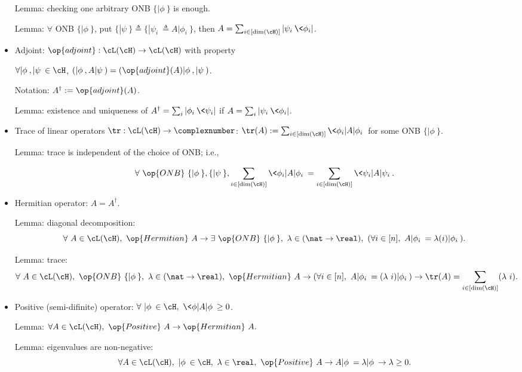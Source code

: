 \begin{itemize}
    Lemma: checking one arbitrary ONB $\{|\phi\>\}$ is enough.
    
    Lemma: $\forall$ ONB $\{|\phi\>\}$, put $\{|\psi\>\}\triangleq\{|\psi_i\> \triangleq A|\phi_i\>\}$, then $A = \sum_{i\in[\dim(\cH)]}|\psi_i\>\<\phi_i|$.
    
    \item Adjoint: $\op{adjoint} : \cL(\cH)\rightarrow\cL(\cH)$ with property
    
    $\forall |\phi\>,|\psi\>\in\cH$, $(|\phi\>,A|\psi\>) = (\op{adjoint}(A)|\phi\>,|\psi\>)$.
    
    Notation: $A^\dag := \op{adjoint}(A)$.
    
    Lemma: existence and uniqueness of $A^\dag = \sum_i|\phi_i\>\<\psi_i|$ if $A = \sum_i|\psi_i\>\<\phi_i|$.
    
    
    \item Trace of linear operators $\tr:\cL(\cH)\rightarrow\complexnumber$: $\tr(A) := \sum_{i\in[\dim(\cH)]}\<\phi_i|A|\phi_i\>$ for some ONB $\{|\phi\>\}$. 
    
    Lemma: trace is independent of the choice of ONB; i.e., 
    
    $$\forall\ \op{ONB}\ \{|\phi\>\}, \{|\psi\>\}, \sum_{i\in[\dim(\cH)]}\<\phi_i|A|\phi_i\> = \sum_{i\in[\dim(\cH)]}\<\psi_i|A|\psi_i\>.$$
    
    
    \item Hermitian operator: $A = A^\dag$.
    
    Lemma: diagonal decomposition: $$\forall\ A\in\cL(\cH),\ \op{Hermitian}\ A \rightarrow \exists\ \op{ONB}\ \{|\phi\>\},\ \lambda\in (\nat\rightarrow\real),\ (\forall i\in[n],\ A|\phi_i\> = \lambda(i) |\phi_i\>).$$
    
    Lemma: trace: $$\forall\ A\in\cL(\cH),\ \op{ONB}\ \{|\phi\>\},\ \lambda\in (\nat\rightarrow\real),\ \op{Hermitian}\ A \rightarrow (\forall i\in[n],\ A|\phi_i\> = (\lambda\ i) |\phi_i\>) \rightarrow \tr(A) = \sum_{i\in[\dim(\cH)]}(\lambda\ i).$$
    
    \item Positive (semi-difinite) operator: $\forall\ |\phi\>\in\cH,\ \<\phi|A|\phi\> \ge 0$.
    
    Lemma: $\forall A\in\cL(\cH),\ \op{Positive}\ A\rightarrow \op{Hermitian}\ A.$
    
    Lemma: eigenvalues are non-negative: $$\forall A\in\cL(\cH),\ |\phi\>\in\cH, \ \lambda\in\real,\ \op{Positive}\ A \rightarrow A|\phi\> = \lambda|\phi\> \rightarrow \lambda\ge 0.$$
    

\end{itemize}
